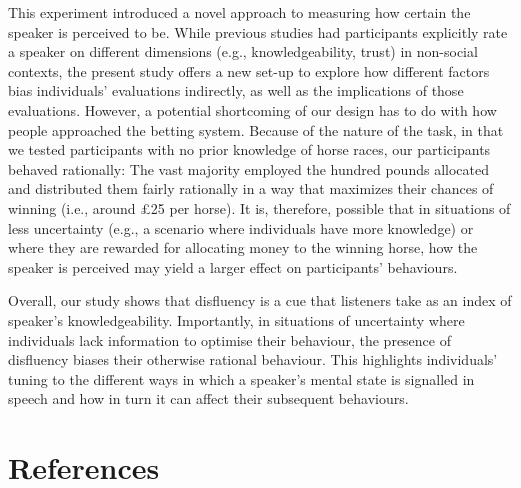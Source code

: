 \documentclass[
  man,floatsintext]{apa7}
\begin{document}
This experiment introduced a novel approach to measuring how certain the speaker is perceived to be. While previous studies had participants explicitly rate a speaker on different dimensions (e.g., knowledgeability, trust) in non-social contexts, the present study offers a new set-up to explore how different factors bias individuals' evaluations indirectly, as well as the implications of those evaluations. However, a potential shortcoming of our design has to do with how people approached the betting system. Because of the nature of the task, in that we tested participants with no prior knowledge of horse races, our participants behaved rationally: The vast majority employed the hundred pounds allocated and distributed them fairly rationally in a way that maximizes their chances of winning (i.e., around £25 per horse). It is, therefore, possible that in situations of less uncertainty (e.g., a scenario where individuals have more knowledge) or where they are rewarded for allocating money to the winning horse, how the speaker is perceived may yield a larger effect on participants' behaviours.

Overall, our study shows that disfluency is a cue that listeners take as an index of speaker's knowledgeability. Importantly, in situations of uncertainty where individuals lack information to optimise their behaviour, the presence of disfluency biases their otherwise rational behaviour. This highlights individuals' tuning to the different ways in which a speaker's mental state is signalled in speech and how in turn it can affect their subsequent behaviours.

\newpage

\hypertarget{references}{%
\section{References}\label{references}}
\end{document}
